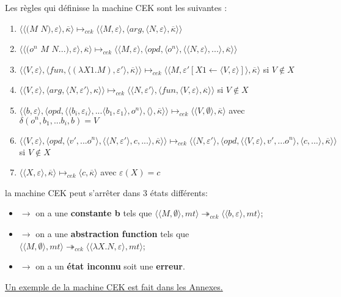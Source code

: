 \documentclass[10pt,a4paper]{article}
\begin{document}
			
			Les règles qui définisse la machine CEK sont les suivantes :
			\begin{enumerate}
				\item $\langle\langle(M$ $N),\varepsilon\rangle,\overline{\kappa}\rangle \longmapsto_{cek} \langle \langle M,\varepsilon\rangle,\langle arg,\langle N,\varepsilon\rangle,\overline{\kappa}\rangle\rangle$
				\item $\langle\langle(o^{n}$ $M$ $N...),\varepsilon\rangle,\overline{\kappa}\rangle \longmapsto_{cek} \langle \langle M,\varepsilon\rangle,\langle opd,\langle o^{n}\rangle,\langle \langle N,\varepsilon\rangle,...\rangle,\overline{\kappa}\rangle\rangle$
				\item $\langle\langle V,\varepsilon\rangle,\langle fun,\langle (\lambda X1.M),\varepsilon'\rangle,\overline{\kappa} \rangle \rangle \longmapsto_{cek} \langle \langle M,\varepsilon'[X1 \leftarrow \langle V,\varepsilon\rangle]\rangle,\overline{\kappa}\rangle$ si $V \notin X$
				\item  $\langle \langle V,\varepsilon\rangle,\langle arg,\langle N,\varepsilon'\rangle,\kappa\rangle\rangle \longmapsto_{cek} \langle \langle N,\varepsilon'\rangle,\langle fun,\langle V,\varepsilon\rangle,\overline{\kappa}\rangle\rangle$ si $V \notin X$
				\item $\langle  \langle b,\varepsilon\rangle,\langle opd,\langle \langle b_{i},\varepsilon_{i}\rangle,...\langle b_{1},\varepsilon_{1}\rangle ,o^{n}\rangle,\langle\rangle,\overline{\kappa}\rangle\rangle \longmapsto_{cek} \langle \langle V,\emptyset\rangle,\overline{\kappa}\rangle$ avec $\delta(o^{n},b_{1},...b_{i},b) = V$
				\item $\langle \langle V,\varepsilon\rangle,\langle opd,\langle v',...o^{n}\rangle,\langle  \langle N,\varepsilon'\rangle,c,...\rangle,\overline{\kappa}\rangle\rangle \longmapsto_{cek} \langle \langle N,\varepsilon'\rangle,\langle opd,\langle  \langle V,\varepsilon\rangle,v',...o^{n}\rangle,\langle c,...\rangle,\overline{\kappa}\rangle\rangle$ si $V \notin X$	
				\item $\langle\langle X,\varepsilon\rangle,\overline{\kappa}\rangle \longmapsto_{cek} \langle c,\overline{\kappa}\rangle$ avec $\varepsilon(X) = c$
			\end{enumerate}
			\bigbreak
			
			
			la machine CEK peut s'arrêter dans 3 états différents:
			\begin{itemize}
				\item[]$\longrightarrow$ on a une \textbf{constante b} tels que $\langle \langle M,\emptyset\rangle,mt\rangle \twoheadrightarrow_{cek} \langle\langle b,\varepsilon\rangle,mt\rangle$;
				\item[]$\longrightarrow$ on a une \textbf{abstraction function} tels que $\langle \langle M,\emptyset\rangle,mt\rangle \twoheadrightarrow_{cek} \langle\langle \lambda X.N,\varepsilon\rangle,mt\rangle$;
				\item[]$\longrightarrow$ on a un \textbf{état inconnu} soit une \textbf{erreur}.
			\end{itemize}
			\hyperref[CEK]{Un exemple de la machine CEK est fait dans les Annexes.}
			\bigbreak
			
\end{document}
